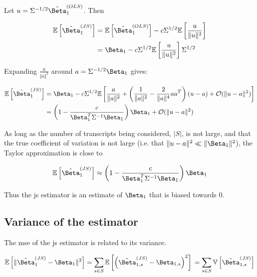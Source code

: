 Let $u = \Sigma^{-1/2}\hat{\Beta}_1^{(OLS)}$.
Then

\begin{align*}
  \mathbb{E}\left[ \hat{\Beta}_1^{(JS)} \right] &= \mathbb{E} \left[ \hat{\Beta}_1^{(OLS)} \right] - c\Sigma^{1/2}\mathbb{E} \left[ \frac{u}{\Vert u \Vert ^2} \right] \\
  &= \Beta_1 - c\Sigma^{1/2}\mathbb{E} \left[ \frac{u}{\Vert u \Vert ^2} \right] \Sigma^{1/2}\\
\end{align*}

Expanding $\frac{u}{\Vert u \Vert ^2}$ around $a = \Sigma^{-1/2}\Beta_1$ gives:

\begin{align*}
  \mathbb{E}\left[ \hat{\Beta}_1^{(JS)} \right]
  &= \Beta_1 - c\Sigma^{1/2}\mathbb{E} \left[ \frac{a}{\Vert a \Vert ^2} + \left( \frac{1}{\Vert a \Vert ^2}
    - \frac{2}{\Vert a \Vert ^4} aa^T\right)(u - a) + \mathcal{O}(\Vert u - a \Vert ^2)\right] \\
  & = \left(1 - \frac{c}{\Beta_1^T \Sigma^{-1} \Beta_1} \right) \Beta_1
    + \mathcal{O}(\Vert u - a \Vert ^2)
\end{align*}

As long as the number of transcripts being considered, $|S|$, is not large, and that the true coefficient of variation is not large (i.e. that $\Vert u - a \Vert ^2 \ll \Vert \Beta_1 \Vert ^2$), the Taylor approximation is close to

\begin{equation}
  \mathbb{E}\left[ \hat{\Beta}_1^{(JS)} \right] \approx \left(1 - \frac{c}{\Beta_1^T \Sigma^{-1} \Beta_1} \right) \Beta_1
\end{equation}

Thus the \gls{js} estimator is an estimate of $\Beta_1$ that is biased towards 0.

\subsection{Variance of the  estimator}

The \gls{mse} of the \gls{js} estimator is related to its variance.

\begin{equation*}
  \mathbb{E} \left[ \Vert \hat{\Beta}_1^{(JS)} - \Beta_1 \Vert ^2\right] 
  = \sum_{s \in S} \mathbb{E}\left[ \left( \hat{\Beta}_{1,s}^{(JS)} - \Beta_{1,s} \right)^2 \right] \\
  = \sum_{s \in S} \mathbb{V}\left[ \hat{\Beta}_{1,s}^{(JS)} \right]
\end{equation*}

